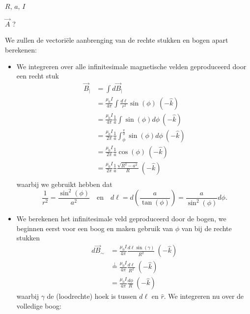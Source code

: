 \begin{description}[labelwidth=1.5cm, leftmargin=!]
    \item[Geg. :]   $R$, $a$, $I$
    \item[Gevr. :]  $\Vec{A}$ ?
    \item[Opl. :]  
    We zullen de vectoriële aanbrenging van de rechte stukken en bogen apart berekenen:
    \begin{itemize}
        \item 
            We integreren over alle infinitesimale magnetische velden geproduceerd door een recht stuk 
            \begin{align*}
                \vec{B}_{|} 
                    &= \int d\Vec{B}_{|} \\
                    &= \frac{\mu_0I}{4\pi}\int\frac{d\ell}{r^2} \sin(\phi) \ (-\hat{k}) \\
                    &= \frac{\mu_0I}{4\pi}\frac{1}{a} \int \sin(\phi) d\phi  \ (-\hat{k}) \\
                    &= \frac{\mu_0I}{2\pi}\frac{1}{a} \int_{\phi}^{\frac{\pi}{2}} \sin(\phi) d\phi  \ (-\hat{k}) \\
                    &= \frac{\mu_0I}{2\pi}\frac{1}{a} \cos(\phi) \ (-\hat{k}) \\
                    &= \frac{\mu_0I}{2\pi}\frac{1}{a} \frac{\sqrt{R^2-a^2}}{R} \ (-\hat{k}) \\
            \end{align*}
            waarbij we gebruikt hebben dat
            \begin{equation*}
                \frac{1}{r^2} = \frac{\sin^2(\phi)}{a^2}  \quad \text{en} \quad d\ell = d\left(\frac{a}{\tan(\phi)}\right) = \frac{a}{\sin^2(\phi)}d\phi.       
            \end{equation*}
        \item 
            We berekenen het infinitesimale veld geproduceerd door de bogen, we beginnen eerst voor een boog en maken gebruik van $\phi$ van bij de rechte stukken
            \begin{align*}
                d\Vec{B}_{\sim} 
                    &= \frac{\mu_0I}{4\pi}\frac{d\ell \sin(\gamma)}{R^2} \ (-\hat{k}) \\
                    &\overset{\perp}{=} \frac{\mu_0I}{4\pi}\frac{d\ell}{R^2} \ (-\hat{k}) \\
                    &= \frac{\mu_0I}{4\pi}\frac{d\phi}{R} \ (-\hat{k}) 
            \end{align*}
            waarbij $\gamma$ de (loodrechte) hoek is tussen $d\ell$ en $\hat{r}$. We integreren nu over de volledige boog:

\end{itemize}
\end{description}
